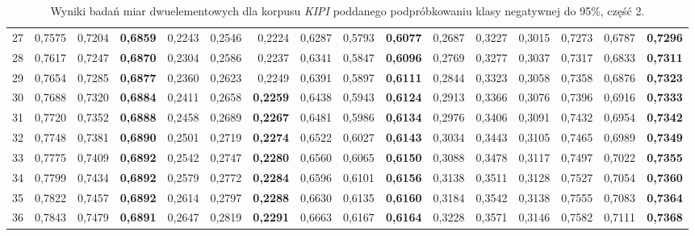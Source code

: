 \begin{table}[htp!]
\begin{adjustwidth}{-2cm}{}
\begin{tabular}{ l | *{15}{| r}}
27	&	0,7575	&	0,7204	&	\textbf{0,6859}	&	0,2243	&	0,2546	&	0,2224	&	0,6287	&	0,5793	&	\textbf{0,6077}	&	0,2687	&	0,3227	&	0,3015	&	0,7273	&	0,6787	&	\textbf{0,7296}	\\
28	&	0,7617	&	0,7247	&	\textbf{0,6870}	&	0,2304	&	0,2586	&	0,2237	&	0,6341	&	0,5847	&	\textbf{0,6096}	&	0,2769	&	0,3277	&	0,3037	&	0,7317	&	0,6833	&	\textbf{0,7311}	\\
29	&	0,7654	&	0,7285	&	\textbf{0,6877}	&	0,2360	&	0,2623	&	0,2249	&	0,6391	&	0,5897	&	\textbf{0,6111}	&	0,2844	&	0,3323	&	0,3058	&	0,7358	&	0,6876	&	\textbf{0,7323}	\\
30	&	0,7688	&	0,7320	&	\textbf{0,6884}	&	0,2411	&	0,2658	&	\textbf{0,2259}	&	0,6438	&	0,5943	&	\textbf{0,6124}	&	0,2913	&	0,3366	&	0,3076	&	0,7396	&	0,6916	&	\textbf{0,7333}	\\
31	&	0,7720	&	0,7352	&	\textbf{0,6888}	&	0,2458	&	0,2689	&	\textbf{0,2267}	&	0,6481	&	0,5986	&	\textbf{0,6134}	&	0,2976	&	0,3406	&	0,3091	&	0,7432	&	0,6954	&	\textbf{0,7342}	\\
32	&	0,7748	&	0,7381	&	\textbf{0,6890}	&	0,2501	&	0,2719	&	\textbf{0,2274}	&	0,6522	&	0,6027	&	\textbf{0,6143}	&	0,3034	&	0,3443	&	0,3105	&	0,7465	&	0,6989	&	\textbf{0,7349}	\\
33	&	0,7775	&	0,7409	&	\textbf{0,6892}	&	0,2542	&	0,2747	&	\textbf{0,2280}	&	0,6560	&	0,6065	&	\textbf{0,6150}	&	0,3088	&	0,3478	&	0,3117	&	0,7497	&	0,7022	&	\textbf{0,7355}	\\
34	&	0,7799	&	0,7434	&	\textbf{0,6892}	&	0,2579	&	0,2772	&	\textbf{0,2284}	&	0,6596	&	0,6101	&	\textbf{0,6156}	&	0,3138	&	0,3511	&	0,3128	&	0,7527	&	0,7054	&	\textbf{0,7360}	\\
35	&	0,7822	&	0,7457	&	\textbf{0,6892}	&	0,2614	&	0,2797	&	\textbf{0,2288}	&	0,6630	&	0,6135	&	\textbf{0,6160}	&	0,3184	&	0,3542	&	0,3138	&	0,7555	&	0,7083	&	\textbf{0,7364}	\\
36	&	0,7843	&	0,7479	&	\textbf{0,6891}	&	0,2647	&	0,2819	&	\textbf{0,2291}	&	0,6663	&	0,6167	&	\textbf{0,6164}	&	0,3228	&	0,3571	&	0,3146	&	0,7582	&	0,7111	&	\textbf{0,7368}	\\
	\bottomrule
\end{tabular}
 \end{adjustwidth}
\caption[Wyniki badań miar dwuelementowych dla korpusu \emph{KIPI} poddanego podpróbkowaniu klasy negatywnej do 95\%, część 2]{Wyniki badań miar dwuelementowych dla korpusu \emph{KIPI} poddanego podpróbkowaniu klasy negatywnej do 95\%, część 2.}
\label{KIPI_subsampled_5_part_2}
\end{table}

